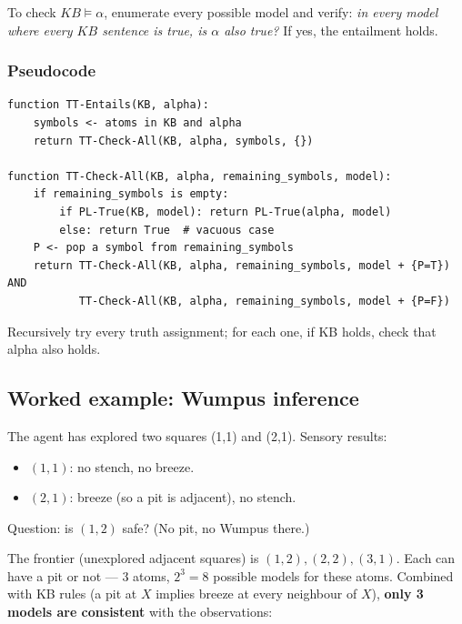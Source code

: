 \documentclass[11pt, a4paper]{article}
\begin{document}
\begin{defbox}
To check $KB \models \alpha$, enumerate every possible model and verify: \emph{in every model where every $KB$ sentence is true, is $\alpha$ also true?} If yes, the entailment holds.
\end{defbox}

\subsubsection*{Pseudocode}

\begin{exbox}
\begin{verbatim}
function TT-Entails(KB, alpha):
    symbols <- atoms in KB and alpha
    return TT-Check-All(KB, alpha, symbols, {})

function TT-Check-All(KB, alpha, remaining_symbols, model):
    if remaining_symbols is empty:
        if PL-True(KB, model): return PL-True(alpha, model)
        else: return True  # vacuous case
    P <- pop a symbol from remaining_symbols
    return TT-Check-All(KB, alpha, remaining_symbols, model + {P=T}) AND
           TT-Check-All(KB, alpha, remaining_symbols, model + {P=F})
\end{verbatim}
Recursively try every truth assignment; for each one, if KB holds, check that alpha also holds.
\end{exbox}

\subsection{Worked example: Wumpus inference}

The agent has explored two squares (1,1) and (2,1). Sensory results:

\begin{itemize}
  \item $(1,1)$: no stench, no breeze.
  \item $(2,1)$: breeze (so a pit is adjacent), no stench.
\end{itemize}

Question: is $(1,2)$ safe? (No pit, no Wumpus there.)

The frontier (unexplored adjacent squares) is $(1,2), (2,2), (3,1)$. Each can have a pit or not — 3 atoms, $2^3 = 8$ possible models for these atoms. Combined with KB rules (a pit at $X$ implies breeze at every neighbour of $X$), \textbf{only 3 models are consistent} with the observations:
\end{document}
